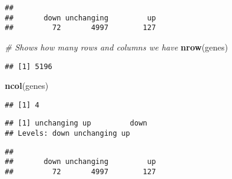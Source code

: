 \documentclass[]{article}
\newenvironment{Shaded}{\begin{snugshade}}{\end{snugshade}}
\newcommand{\KeywordTok}[1]{\textcolor[rgb]{0.13,0.29,0.53}{\textbf{#1}}}
\newcommand{\DataTypeTok}[1]{\textcolor[rgb]{0.13,0.29,0.53}{#1}}
\newcommand{\StringTok}[1]{\textcolor[rgb]{0.31,0.60,0.02}{#1}}
\newcommand{\CommentTok}[1]{\textcolor[rgb]{0.56,0.35,0.01}{\textit{#1}}}
\newcommand{\OperatorTok}[1]{\textcolor[rgb]{0.81,0.36,0.00}{\textbf{#1}}}
\newcommand{\NormalTok}[1]{#1}
\begin{document}
\begin{verbatim}
## 
##       down unchanging         up 
##         72       4997        127
\end{verbatim}

\begin{Shaded}
\begin{Highlighting}[]
\CommentTok{# Shows how many rows and columns we have}
\KeywordTok{nrow}\NormalTok{(genes)}
\end{Highlighting}
\end{Shaded}

\begin{verbatim}
## [1] 5196
\end{verbatim}

\begin{Shaded}
\begin{Highlighting}[]
\KeywordTok{ncol}\NormalTok{(genes)}
\end{Highlighting}
\end{Shaded}

\begin{verbatim}
## [1] 4
\end{verbatim}

\begin{Shaded}
\end{Shaded}

\begin{verbatim}
## [1] unchanging up         down      
## Levels: down unchanging up
\end{verbatim}

\begin{Shaded}
\end{Shaded}

\begin{verbatim}
## 
##       down unchanging         up 
##         72       4997        127
\end{verbatim}

\begin{Shaded}
\end{Shaded}
\end{document}
